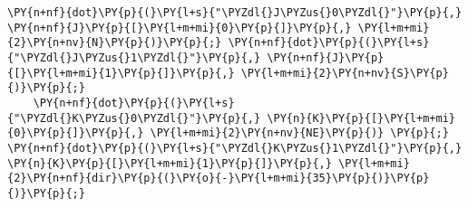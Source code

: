 \begin{Verbatim}[commandchars=\\\{\}]
    \PY{n+nf}{dot}\PY{p}{(}\PY{l+s}{"\PYZdl{}J\PYZus{}0\PYZdl{}"}\PY{p}{,} \PY{n+nf}{J}\PY{p}{[}\PY{l+m+mi}{0}\PY{p}{]}\PY{p}{,} \PY{l+m+mi}{2}\PY{n+nv}{N}\PY{p}{)}\PY{p}{;} \PY{n+nf}{dot}\PY{p}{(}\PY{l+s}{"\PYZdl{}J\PYZus{}1\PYZdl{}"}\PY{p}{,} \PY{n+nf}{J}\PY{p}{[}\PY{l+m+mi}{1}\PY{p}{]}\PY{p}{,} \PY{l+m+mi}{2}\PY{n+nv}{S}\PY{p}{)}\PY{p}{;}
    \PY{n+nf}{dot}\PY{p}{(}\PY{l+s}{"\PYZdl{}K\PYZus{}0\PYZdl{}"}\PY{p}{,} \PY{n}{K}\PY{p}{[}\PY{l+m+mi}{0}\PY{p}{]}\PY{p}{,} \PY{l+m+mi}{2}\PY{n+nv}{NE}\PY{p}{)} \PY{p}{;} \PY{n+nf}{dot}\PY{p}{(}\PY{l+s}{"\PYZdl{}K\PYZus{}1\PYZdl{}"}\PY{p}{,} \PY{n}{K}\PY{p}{[}\PY{l+m+mi}{1}\PY{p}{]}\PY{p}{,} \PY{l+m+mi}{2}\PY{n+nf}{dir}\PY{p}{(}\PY{o}{-}\PY{l+m+mi}{35}\PY{p}{)}\PY{p}{)}\PY{p}{;}
\end{Verbatim}
